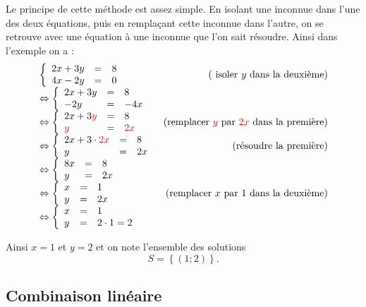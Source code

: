 Le principe de cette méthode est assez simple. En isolant une inconnue dans l'une des deux équations, puis en remplaçant cette inconnue dans l'autre, on se retrouve avec une équation à une inconnue que l'on sait résoudre. Ainsi dans l'exemple on a :
$$
\begin{array}{lr}
\left\{
\begin{array}{lll}
2x+3y &=& 8\\
4x-2y &=& 0
\end{array}
\right.
&(\mbox{ isoler }y\mbox{ dans la deuxième}) \\
\Leftrightarrow \left\{
\begin{array}{lll}
2x+3y &=& 8\\
-2y &=& -4x
\end{array}
\right.
& \\
\Leftrightarrow\left\{
\begin{array}{lll}
2x+3\textcolor{red}{y} &=& 8\\
\textcolor{red}{y} &=& \textcolor{red}{2x}
\end{array}
\right.
&(\mbox{remplacer }\textcolor{red}{y}\mbox{ par }\textcolor{red}{2x}\mbox{ dans la première})\\
\Leftrightarrow\left\{
\begin{array}{lll}
2x+3 \cdot \textcolor{red}{2x} &=& 8\\
y &=& 2x
\end{array}
\right.
&(\mbox{résoudre la première})\\
\Leftrightarrow\left\{
\begin{array}{lll}
8x &=& 8\\
y &=& 2x
\end{array}
\right.
&\\
\Leftrightarrow\left\{
\begin{array}{lll}
x&=& 1\\
y &=& 2x
\end{array}
\right.
&(\mbox{remplacer }x\mbox{ par }1\mbox{ dans la deuxième})\\
\Leftrightarrow\left\{
\begin{array}{lll}
x&=& 1\\
y &=& 2\cdot 1 = 2
\end{array}
\right. & \\
\end{array}
$$

Ainsi $x=1$ et $y=2$ et on note l'ensemble des solutions
$$
S=\left\{(1;2)\right\}.
$$

\subsection{Combinaison linéaire}

